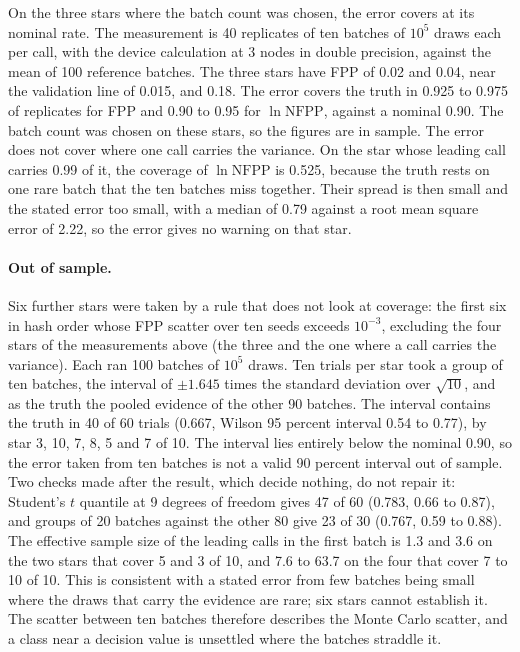 \documentclass[11pt]{article}
\begin{document}
On the three stars where the batch count was chosen, the error covers at its nominal rate. The measurement is 40 replicates of ten batches of $10^{5}$ draws each per call, with the device calculation at 3 nodes in double precision, against the mean of 100 reference batches. The three stars have FPP of 0.02 and 0.04, near the validation line of 0.015, and 0.18. The error covers the truth in 0.925 to 0.975 of replicates for FPP and 0.90 to 0.95 for $\ln\mathrm{NFPP}$, against a nominal 0.90. The batch count was chosen on these stars, so the figures are in sample. The error does not cover where one call carries the variance. On the star whose leading call carries 0.99 of it, the coverage of $\ln\mathrm{NFPP}$ is 0.525, because the truth rests on one rare batch that the ten batches miss together. Their spread is then small and the stated error too small, with a median of 0.79 against a root mean square error of 2.22, so the error gives no warning on that star.

\paragraph{Out of sample.} Six further stars were taken by a rule that does not look at coverage: the first six in hash order whose FPP scatter over ten seeds exceeds $10^{-3}$, excluding the four stars of the measurements above (the three and the one where a call carries the variance). Each ran 100 batches of $10^{5}$ draws. Ten trials per star took a group of ten batches, the interval of $\pm1.645$ times the standard deviation over $\sqrt{10}$, and as the truth the pooled evidence of the other 90 batches. The interval contains the truth in 40 of 60 trials (0.667, Wilson 95 percent interval 0.54 to 0.77), by star 3, 10, 7, 8, 5 and 7 of 10. The interval lies entirely below the nominal 0.90, so the error taken from ten batches is not a valid 90 percent interval out of sample. Two checks made after the result, which decide nothing, do not repair it: Student's $t$ quantile at 9 degrees of freedom gives 47 of 60 (0.783, 0.66 to 0.87), and groups of 20 batches against the other 80 give 23 of 30 (0.767, 0.59 to 0.88). The effective sample size of the leading calls in the first batch is 1.3 and 3.6 on the two stars that cover 5 and 3 of 10, and 7.6 to 63.7 on the four that cover 7 to 10 of 10. This is consistent with a stated error from few batches being small where the draws that carry the evidence are rare; six stars cannot establish it. The scatter between ten batches therefore describes the Monte Carlo scatter, and a class near a decision value is unsettled where the batches straddle it.
\end{document}
